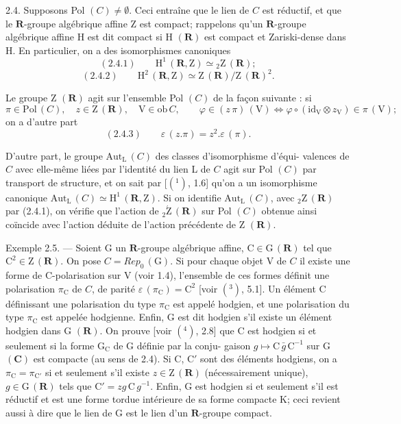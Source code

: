 \documentclass[11pt]{article}
\begin{document}
2.4. Supposons Pol $(C) \neq \emptyset$. Ceci entraîne que le lien de $C$ est réductif,
et que le $\mathbf{R}$-groupe algébrique affine Z est compact; rappelons qu'un
$\mathbf{R}$-groupe algébrique affine H est dit compact si H $(\mathbf{R})$ est compact et
Zariski-dense dans H. En particulier, on a des isomorphismes canoniques
\[ (2.4.1) \qquad \mathrm{H}^1\,(\mathbf{R}, \mathrm{Z}) \simeq {}_2\mathrm{Z}\,(\mathbf{R}); \]
\[ (2.4.2) \qquad \mathrm{H}^2\,(\mathbf{R}, \mathrm{Z}) \simeq \mathrm{Z}\,(\mathbf{R})/\mathrm{Z}\,(\mathbf{R})^2. \]

Le groupe Z $(\mathbf{R})$ agit sur l'ensemble Pol $(C)$ de la façon suivante : si
\[ \pi \in \mathrm{Pol}\,(C), \quad z \in \mathrm{Z}\,(\mathbf{R}), \quad \mathrm{V} \in \mathrm{ob}\, C, \qquad \varphi \in (z\,\pi)\,(\mathrm{V}) \iff \varphi \circ (\mathrm{id}_{\mathrm{V}} \otimes z_{\mathrm{V}}) \in \pi\,(\mathrm{V}); \]
on a d'autre part
\[ (2.4.3) \qquad \varepsilon\,(z.\pi) = z^2.\varepsilon\,(\pi). \]

D'autre part, le groupe $\mathrm{Aut}_{\mathrm{L}}\,(C)$ des classes d'isomorphisme d'équi-%
valences de $C$ avec elle-même liées par l'identité du lien L de $C$ agit
sur Pol $(C)$ par transport de structure, et on sait par [$(^1)$, 1.6] qu'on a
un isomorphisme canonique $\mathrm{Aut}_{\mathrm{L}}\,(C) \simeq \mathrm{H}^1\,(\mathbf{R}, \mathrm{Z})$. Si on identifie $\mathrm{Aut}_{\mathrm{L}}\,(C)$,
avec ${}_2\mathrm{Z}\,(\mathbf{R})$ par (2.4.1), on vérifie que l'action de ${}_2\acute{\mathrm{Z}}\,(\mathbf{R})$ sur Pol $(C)$
obtenue ainsi coïncide avec l'action déduite de l'action précédente de Z $(\mathbf{R})$.

Exemple 2.5. --- Soient G un $\mathbf{R}$-groupe algébrique affine, $\mathrm{C} \in \mathrm{G}\,(\mathbf{R})$ tel
que $\mathrm{C}^2 \in \mathrm{Z}\,(\mathbf{R})$. On pose $C = Rep_0\,(\mathrm{G})$. Si pour chaque objet V de $C$
il existe une forme de C-polarisation sur V (voir 1.4), l'ensemble de ces
formes définit une polarisation $\pi_{\mathrm{C}}$ de $C$, de parité $\varepsilon\,(\pi_{\mathrm{C}}) = \mathrm{C}^2$ [voir $(^3)$, 5.1].
Un élément C définissant une polarisation du type $\pi_{\mathrm{C}}$ est appelé hodgien,
et une polarisation du type $\pi_{\mathrm{C}}$ est appelée hodgienne. Enfin, G est dit
hodgien s'il existe un élément hodgien dans G $(\mathbf{R})$. On prouve [voir $(^4)$, 2.8]
que C est hodgien si et seulement si la forme $\mathrm{G}_{\mathrm{C}}$ de G définie par la conju-%
gaison $g \mapsto \mathrm{C}\,\bar{g}\,\mathrm{C}^{-1}$ sur G $(\mathbf{C})$ est compacte (au sens de 2.4). Si C, C$'$ sont
des éléments hodgiens, on a $\pi_{\mathrm{C}} = \pi_{\mathrm{C}'}$ si et seulement s'il existe $z \in \mathrm{Z}\,(\mathbf{R})$
(nécessairement unique), $g \in \mathrm{G}\,(\mathbf{R})$ tels que $\mathrm{C}' = zg\,\mathrm{C}\,g^{-1}$. Enfin, G est
hodgien si et seulement s'il est réductif et est une forme tordue intérieure
de sa forme compacte K; ceci revient aussi à dire que le lien de G est le
lien d'un $\mathbf{R}$-groupe compact.
\end{document}

